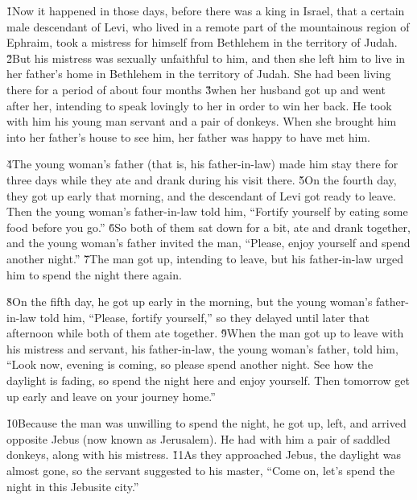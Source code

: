 \v{1}Now it happened in those days, before there was a king in Israel, that a certain male descendant of Levi, who lived in a remote part of the mountainous region of Ephraim, took a mistress for himself from Bethlehem in the territory of Judah. \v{2}But his mistress was sexually unfaithful to him, and then she left him to live in her father's home in Bethlehem in the territory of Judah. She had been living there for a period of about four months \v{3}when her husband got up and went after her, intending to speak lovingly to her in order to win her back. He took with him his young man servant and a pair of donkeys. When she brought him into her father's house to see him, her father was happy to have met him.

\v{4}The young woman's father (that is, his father-in-law) made him stay there for three days while they ate and drank during his visit there. \v{5}On the fourth day, they got up early that morning, and the descendant of Levi got ready to leave. Then the young woman's father-in-law told him, ``Fortify yourself by eating some food before you go.'' \v{6}So both of them sat down for a bit, ate and drank together, and the young woman's father invited the man, ``Please, enjoy yourself and spend another night.'' \v{7}The man got up, intending to leave, but his father-in-law urged him to spend the night there again.

\v{8}On the fifth day, he got up early in the morning, but the young woman's father-in-law told him, ``Please, fortify yourself,'' so they delayed until later that afternoon while both of them ate together. \v{9}When the man got up to leave with his mistress and servant, his father-in-law, the young woman's father, told him, ``Look now, evening is coming, so please spend another night. See how the daylight is fading, so spend the night here and enjoy yourself. Then tomorrow get up early and leave on your journey home.''

\v{10}Because the man was unwilling to spend the night, he got up, left, and arrived opposite Jebus (now known as Jerusalem). He had with him a pair of saddled donkeys, along with his mistress. \v{11}As they approached Jebus, the daylight was almost gone, so the servant suggested to his master, ``Come on, let's spend the night in this Jebusite city.''


